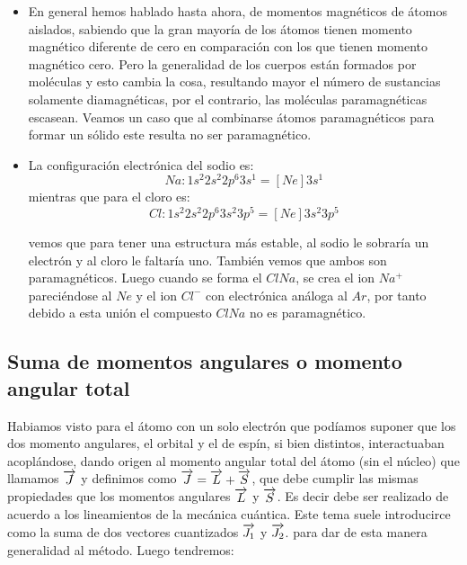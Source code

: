 \begin{itemize}
	\item En general hemos hablado hasta ahora, de momentos magnéticos de átomos aislados, sabiendo que la gran mayoría de los átomos tienen momento magnético diferente de cero en comparación con los que tienen momento magnético cero. Pero la generalidad de los cuerpos están formados por moléculas y esto cambia la cosa, resultando mayor el número de sustancias solamente diamagnéticas, por el contrario, las moléculas paramagnéticas escasean. Veamos un caso que al combinarse átomos paramagnéticos para formar un sólido este resulta no ser paramagnético.
	\item La configuración electrónica del sodio es:\\
	\begin{equation}
		Na: 1s^{2} 2s^{2} 2p^{6} 3s^{1}  = [Ne]3s^{1}	
	\end{equation}		
mientras que para el cloro es:
	\begin{equation}
	Cl: 1s^{2} 2s^{2} 2p^{6} 3s^{2} 3p^{5}  = [Ne]3s^{2} 3p^{5}
	\end{equation}
	
vemos que para tener una estructura más estable, al sodio le sobraría un electrón y al cloro le faltaría uno. También vemos que ambos son paramagnéticos. Luego cuando se forma el $ClNa$, se crea el ion $Na^{+}$ pareciéndose al $Ne$ y el ion $Cl^{-}$ con electrónica análoga al $Ar$, por tanto debido a esta unión el compuesto $ClNa$ no es paramagnético.
\end{itemize}





\subsection{Suma de momentos angulares o momento angular total}

Habiamos visto para el átomo con un solo electrón que podíamos suponer que los dos momento angulares, el orbital y el de espín, si bien distintos, interactuaban acoplándose, dando origen al momento angular total del átomo (sin el núcleo) que llamamos $\overrightarrow{J}$ y definimos como $\overrightarrow{J}=\overrightarrow{L}+\overrightarrow{S}$, que debe cumplir las mismas propiedades que los momentos angulares $\overrightarrow{L}$ y $\overrightarrow{S}$. Es decir debe ser realizado de acuerdo a los lineamientos de la mecánica cuántica. Este tema suele introducirce como la suma de dos vectores cuantizados $\overrightarrow{J_{1}}$ y $\overrightarrow{J_{2}}$. para dar de esta manera generalidad al método. Luego tendremos:


